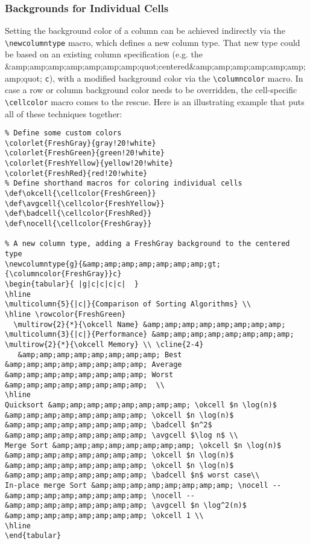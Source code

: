 \subsubsection{Backgrounds for Individual Cells}

Setting the background color of a column can be achieved indirectly via the \verb|\newcolumntype| macro, which defines a new column type. That new type could be based on an existing column specification (e.g. the &amp;amp;amp;amp;amp;amp;amp;quot;centered&amp;amp;amp;amp;amp;amp;amp;quot; \verb|c|), with a modified background color via the \verb|\columncolor| macro. In case a row or column background color needs to be overridden, the cell-specific \verb|\cellcolor| macro comes to the rescue. Here is an illustrating example that puts all of these techniques together:

\begin{lstlisting}
% Define some custom colors
\colorlet{FreshGray}{gray!20!white}
\colorlet{FreshGreen}{green!20!white}
\colorlet{FreshYellow}{yellow!20!white}
\colorlet{FreshRed}{red!20!white}
% Define shorthand macros for coloring individual cells
\def\okcell{\cellcolor{FreshGreen}}
\def\avgcell{\cellcolor{FreshYellow}}
\def\badcell{\cellcolor{FreshRed}}
\def\nocell{\cellcolor{FreshGray}}

% A new column type, adding a FreshGray background to the centered type
\newcolumntype{g}{&amp;amp;amp;amp;amp;amp;amp;gt;{\columncolor{FreshGray}}c}
\begin{tabular}{ |g|c|c|c|c|  }
\hline
\multicolumn{5}{|c|}{Comparison of Sorting Algorithms} \\
\hline \rowcolor{FreshGreen} 
  \multirow{2}{*}{\okcell Name} &amp;amp;amp;amp;amp;amp;amp;amp; \multicolumn{3}{|c|}{Performance} &amp;amp;amp;amp;amp;amp;amp;amp; \multirow{2}{*}{\okcell Memory} \\ \cline{2-4}
   &amp;amp;amp;amp;amp;amp;amp;amp; Best &amp;amp;amp;amp;amp;amp;amp;amp; Average &amp;amp;amp;amp;amp;amp;amp;amp; Worst &amp;amp;amp;amp;amp;amp;amp;amp;  \\
\hline
Quicksort &amp;amp;amp;amp;amp;amp;amp;amp; \okcell $n \log(n)$ &amp;amp;amp;amp;amp;amp;amp;amp; \okcell $n \log(n)$ &amp;amp;amp;amp;amp;amp;amp;amp; \badcell $n^2$ &amp;amp;amp;amp;amp;amp;amp;amp; \avgcell $\log n$ \\
Merge Sort &amp;amp;amp;amp;amp;amp;amp;amp; \okcell $n \log(n)$ &amp;amp;amp;amp;amp;amp;amp;amp; \okcell $n \log(n)$ &amp;amp;amp;amp;amp;amp;amp;amp; \okcell $n \log(n)$ &amp;amp;amp;amp;amp;amp;amp;amp; \badcell $n$ worst case\\
In-place merge Sort &amp;amp;amp;amp;amp;amp;amp;amp; \nocell -- &amp;amp;amp;amp;amp;amp;amp;amp; \nocell -- &amp;amp;amp;amp;amp;amp;amp;amp; \avgcell $n \log^2(n)$ &amp;amp;amp;amp;amp;amp;amp;amp; \okcell 1 \\
\hline
\end{tabular}
\end{lstlisting}

